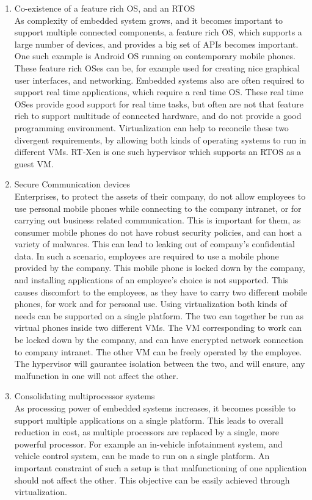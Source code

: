 \documentclass[a4paper,10pt]{article}
\begin{document}
\begin{enumerate}
 \item Co-existence of a feature rich OS, and an RTOS\\
 As complexity of embedded system grows, and it becomes important to support multiple connected components, a feature rich OS, which supports a large number of devices, and 
 provides a big set of APIs becomes important. One such example is Android OS running on contemporary mobile phones. These feature rich OSes can be, for example used for creating
  nice graphical user interfaces, and networking. 
 Embedded systems also are often required to support real time applications, which require a real time OS. These real time OSes provide good support for real time tasks, but often
  are not that feature rich to support multitude of connected hardware, and do not provide a good programming environment. Virtualization can help to reconcile these two divergent requirements, 
  by allowing both kinds of operating systems to run in different VMs. RT-Xen is one such hypervisor which supports an RTOS as a guest VM.
  \item Secure Communication devices\\
  Enterprises, to protect the assets of their company, do not allow employees to use personal mobile phones while connecting to the company intranet, or for carrying out
  business related communication. This is important for them, as consumer mobile phones do not have robust security policies, and can host a variety of malwares. This can lead to
   leaking out of company's confidential data.
    In such a scenario, employees are required to use a mobile phone provided by the company. This mobile phone is locked down by the company, and installing applications of
     an employee's choice is not supported. This causes discomfort to the employees, as they have to carry two different mobile phones, for work and for personal use. 
     Using virtualization both kinds of needs can be supported on a single platform. The two can together be run as virtual phones inside two different VMs. The VM corresponding to
     work can be locked down by the company, and can have encrypted network connection to company intranet. The other VM can be freely operated by the employee.
     The hypervisor will gaurantee isolation between the two, and will ensure, any malfunction in one will not affect the other.
     \item Consolidating multiprocessor systems\\
     As processing power of embedded systems increases, it becomes possible to support multiple applications on a single platform. This leads to overall reduction in cost, as multiple 
     processors are replaced by a single, more powerful processor. For example an in-vehicle infotainment system, and 
     vehicle control system, can be made to run on a single platform. An important constraint of such a setup is that malfunctioning of one application should not 
     affect the other. This objective can be easily achieved through virtualization.
\end{enumerate}
\end{document}
